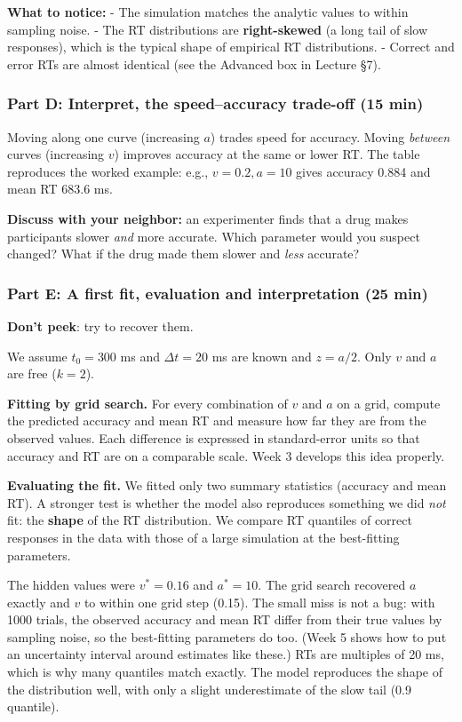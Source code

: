 \textbf{What to notice:} - The simulation matches the analytic values to
within sampling noise. - The RT distributions are \textbf{right-skewed}
(a long tail of slow responses), which is the typical shape of empirical
RT distributions. - Correct and error RTs are almost identical (see the
Advanced box in Lecture §7).

\subsubsection{Part D: Interpret, the speed--accuracy trade-off (15
min)}

Moving along one curve (increasing \(a\)) trades speed for accuracy.
Moving \emph{between} curves (increasing \(v\)) improves accuracy at the
same or lower RT. The table reproduces the worked example: e.g.,
\(v = 0.2, a = 10\) gives accuracy 0.884 and mean RT 683.6 ms.

\textbf{Discuss with your neighbor:} an experimenter finds that a drug
makes participants slower \emph{and} more accurate. Which parameter
would you suspect changed? What if the drug made them slower and
\emph{less} accurate?

\subsubsection{Part E: A first fit, evaluation and interpretation (25
min)}

\textbf{Don't peek}: try to recover them.

We assume \(t_0 = 300\) ms and \(\Delta t = 20\) ms are known and
\(z = a/2\). Only \(v\) and \(a\) are free (\(k = 2\)).

\textbf{Fitting by grid search.} For every combination of \(v\) and
\(a\) on a grid, compute the predicted accuracy and mean RT and measure
how far they are from the observed values. Each difference is expressed
in standard-error units so that accuracy and RT are on a comparable
scale. Week 3 develops this idea properly.

\textbf{Evaluating the fit.} We fitted only two summary statistics
(accuracy and mean RT). A stronger test is whether the model also
reproduces something we did \emph{not} fit: the \textbf{shape} of the RT
distribution. We compare RT quantiles of correct responses in the data
with those of a large simulation at the best-fitting parameters.

The hidden values were \(v^\ast = 0.16\) and \(a^\ast = 10\). The grid
search recovered \(a\) exactly and \(v\) to within one grid step (0.15).
The small miss is not a bug: with 1000 trials, the observed accuracy and
mean RT differ from their true values by sampling noise, so the
best-fitting parameters do too. (Week 5 shows how to put an uncertainty
interval around estimates like these.) RTs are multiples of 20 ms, which
is why many quantiles match exactly. The model reproduces the shape of
the distribution well, with only a slight underestimate of the slow tail
(0.9 quantile).


